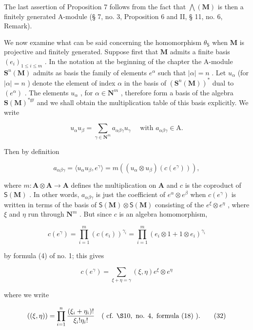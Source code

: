 The last assertion of Proposition 7 follows from the fact that \(\bigwedge (\mathbf{M})\) is then a finitely generated A-module (§ 7, no. 3, Proposition 6 and II, § 11, no. 6, Remark).

We now examine what can be said concerning the homomorphism \(\theta_{\mathsf{S}}\) when \(\mathbf{M}\) is projective and finitely generated. Suppose first that \(\mathbf{M}\) admits a finite basis \((e_i)_{1\leq i\leq m}\) . In the notation at the beginning of the chapter the A-module \(\mathbf{S}^n (\mathbf{M})\) admits as basis the family of elements \(e^{\alpha}\) such that \(|\alpha | = n\) . Let \(u_{\alpha}\) (for \(|\alpha | = n\) ) denote the element of index \(\alpha\) in the basis of \((\mathbf{S}^n (\mathbf{M}))^*\) dual to \((e^{\alpha})\) . The elements \(u_{\alpha}\) , for \(\alpha \in \mathbf{N}^m\) , therefore form a basis of the algebra \(\mathbf{S}(\mathbf{M})^{*\mathrm{gr}}\) and we shall obtain the multiplication table of this basis explicitly. We write

\[
u _ {\alpha} u _ {\beta} = \sum_ {\gamma \in \mathbf {N} ^ {m}} a _ {\alpha \beta \gamma} u _ {\gamma} \quad \text { with } a _ {\alpha \beta \gamma} \in \mathrm{A}.
\]

Then by definition

\[
a _ {\alpha \beta \gamma} = \langle u _ {\alpha} u _ {\beta}, e ^ {\gamma} \rangle = m ((u _ {\alpha} \otimes u _ {\beta}) (c (e ^ {\gamma}))),
\]

where \(m: \mathbf{A} \otimes \mathbf{A} \to \mathbf{A}\) defines the multiplication on \(\mathbf{A}\) and \(c\) is the coproduct of \(\mathsf{S}(\mathbf{M})\) . In other words, \(a_{\alpha \beta \gamma}\) is just the coefficient of \(e^{\alpha} \otimes e^{\beta}\) when \(c(e^{\gamma})\) is written in terms of the basis of \(\mathsf{S}(\mathbf{M})\otimes \mathsf{S}(\mathbf{M})\) consisting of the \(e^{\xi}\otimes e^{\eta}\) , where \(\xi\) and \(\eta\) run through \(\mathbf{N}^m\) . But since \(c\) is an algebra homomorphism,

\[
c (e ^ {\gamma}) = \prod_ {i = 1} ^ {m} (c (e _ {i})) ^ {\gamma_ {i}} = \prod_ {i = 1} ^ {m} (e _ {i} \otimes 1 + 1 \otimes e _ {i}) ^ {\gamma_ {i}}
\]

by formula (4) of no. 1; this gives

\[
c (e ^ {\gamma}) = \sum_ {\xi + \eta = \gamma} (\xi , \eta) e ^ {\xi} \otimes e ^ {\eta}\tag{31}
\]

where we write

\[
((\xi , \eta)) = \prod_ {i = 1} ^ {n} \frac {(\xi_ {i} + \eta_ {i}) !}{\xi_ {i} ! \eta_ {i} !} \quad (\text { cf.   } \S 10, \text {   no.   } 4, \text {   formula   (18) }).\tag{32}
\]

